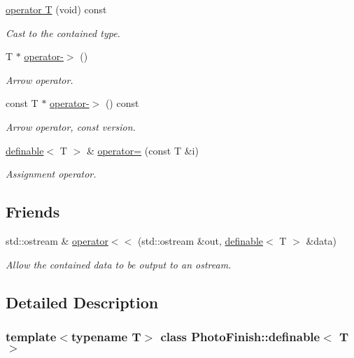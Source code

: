 \begin{DoxyCompactItemize}
\hyperlink{class_photo_finish_1_1definable_ad51147fde36f7c86f7c4b09bafce45fe}{operator T} (void) const
\begin{DoxyCompactList}\small\item\em Cast to the contained type. \end{DoxyCompactList}\item 
T $\ast$ \hyperlink{class_photo_finish_1_1definable_a0e82c3242b2da5bb3ad65cf2149b6f30}{operator-\/$>$} ()
\begin{DoxyCompactList}\small\item\em Arrow operator. \end{DoxyCompactList}\item 
const T $\ast$ \hyperlink{class_photo_finish_1_1definable_abeb8cd4e0d95d064ba43c61ed092e77a}{operator-\/$>$} () const
\begin{DoxyCompactList}\small\item\em Arrow operator, const version. \end{DoxyCompactList}\item 
\hyperlink{class_photo_finish_1_1definable}{definable}$<$ T $>$ \& \hyperlink{class_photo_finish_1_1definable_a9d4202ced2d61cafad392d48db9ccfc6}{operator=} (const T \&i)
\begin{DoxyCompactList}\small\item\em Assignment operator. \end{DoxyCompactList}\end{DoxyCompactItemize}
\subsection*{Friends}
\begin{DoxyCompactItemize}
\item 
std\+::ostream \& \hyperlink{class_photo_finish_1_1definable_a54dc7324456d4b6642fd684552720cf2}{operator$<$$<$} (std\+::ostream \&out, \hyperlink{class_photo_finish_1_1definable}{definable}$<$ T $>$ \&data)
\begin{DoxyCompactList}\small\item\em Allow the contained data to be output to an ostream. \end{DoxyCompactList}\end{DoxyCompactItemize}


\subsection{Detailed Description}
\subsubsection*{template$<$typename T$>$\newline
class Photo\+Finish\+::definable$<$ T $>$}

